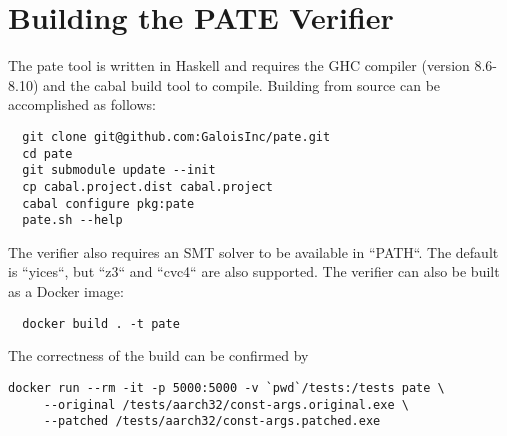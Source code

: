 
\section{Building the PATE Verifier}
\label{sec:build-pate-verif}

The pate tool is written in Haskell and requires the GHC compiler
(version 8.6-8.10) and the cabal build tool to compile.  Building from
source can be accomplished as follows:
\begin{verbatim}
  git clone git@github.com:GaloisInc/pate.git
  cd pate
  git submodule update --init
  cp cabal.project.dist cabal.project
  cabal configure pkg:pate
  pate.sh --help
\end{verbatim}
The verifier also requires an SMT solver to be available in
``PATH``. The default is ``yices``, but ``z3`` and ``cvc4`` are also
supported.   The verifier can also be built as a Docker image:
\begin{verbatim}
  docker build . -t pate
\end{verbatim}
The correctness of the build can be confirmed by
\begin{verbatim}
docker run --rm -it -p 5000:5000 -v `pwd`/tests:/tests pate \
     --original /tests/aarch32/const-args.original.exe \
     --patched /tests/aarch32/const-args.patched.exe
\end{verbatim}


